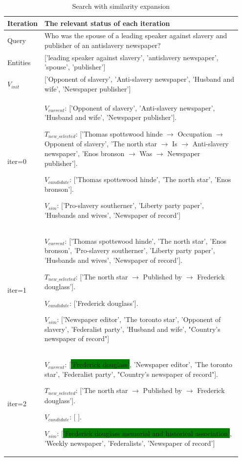\documentclass{article}
\theoremstyle{plain}
\theoremstyle{definition}
\theoremstyle{remark}
\begin{document}
\begin{table}[htb]
  \centering
  \caption{Search with similarity expansion}
  \label{tab:search_with_sim}
  \begin{tabular}{p{0.1\linewidth}|p{0.85\linewidth}}
    \toprule
    Iteration & The relevant status of each iteration \\ \hline
    Query  & Who was the spouse of a leading speaker against slavery and publisher of an antislavery newspaper?  \\ 
    \hline
    Entities  & ['leading speaker against slavery', 'antislavery newspaper', 'spouse', 'publisher']  \\ 
    \hline
    $V_{init}$  & ['Opponent of slavery', 'Anti-slavery newspaper', 'Husband and wife', 'Newspaper publisher']  \\ 
    \hline
    iter=0  & $V_{current}$: ['Opponent of slavery', 'Anti-slavery newspaper', 'Husband and wife', 'Newspaper publisher']. \par$T_{new\_selected}$: ['Thomas spottswood hinde $\rightarrow$ Occupation $\rightarrow$ Opponent of slavery', 'The north star $\rightarrow$ Is $\rightarrow$ Anti-slavery newspaper', 'Enos bronson $\rightarrow$ Was $\rightarrow$ Newspaper publisher']. \par$V_{candidate}$: ['Thomas spottswood hinde', 'The north star', 'Enos bronson']. \par $V_{sim}$: ['Pro-slavery southerner', 'Liberty party paper', 'Husbands and wives', 'Newspaper of record']\\ 
    \hline
    iter=1  & $V_{current}$: ['Thomas spottswood hinde', 'The north star', 'Enos bronson', 'Pro-slavery southerner', 'Liberty party paper', 'Husbands and wives', 'Newspaper of record']. \par$T_{new\_selected}$: ['The north star $\rightarrow$ Published by $\rightarrow$ Frederick douglass']. \par$V_{candidate}$: ['Frederick douglass']. \par $V_{sim}$: ['Newspaper editor', 'The toronto star', 'Opponent of slavery', 'Federalist party', 'Husband and wife', "Country's newspaper of record"]\\ 
    \hline
    iter=2  & $V_{current}$: [\colorbox{green}{'Frederick douglass'}, 'Newspaper editor', 'The toronto star', 'Federalist party', "Country's newspaper of record"]. \par$T_{new\_selected}$: ['The north star $\rightarrow$ Published by $\rightarrow$ Frederick douglass']. \par$V_{candidate}$: [ ]. \par$V_{sim}$: [\colorbox{green}{'Frederick douglass memorial and historical association'}, 'Weekly newspaper', 'Federalists', 'Newspaper of record']\\

\end{tabular}
\end{table}
\end{document}
